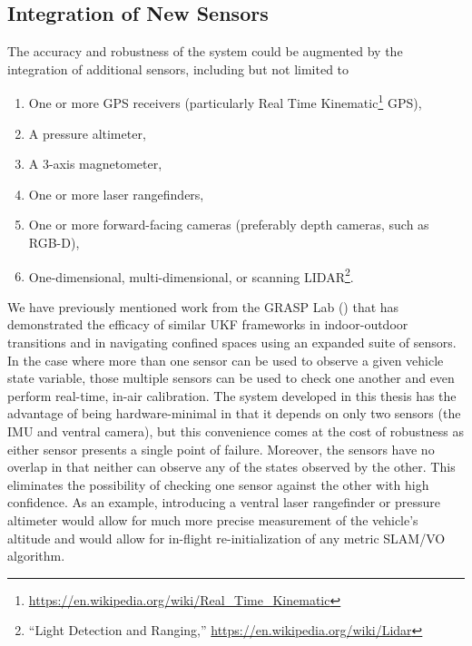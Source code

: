 \subsection{Integration of New Sensors}
The accuracy and robustness of the system could be augmented by the integration of additional sensors, including but not limited to
\begin{enumerate}
    \item One or more GPS receivers (particularly Real Time Kinematic\footnote{\url{https://en.wikipedia.org/wiki/Real_Time_Kinematic}} GPS),
    \item A pressure altimeter,
    \item A 3-axis magnetometer,
    \item One or more laser rangefinders,
    \item One or more forward-facing cameras (preferably depth cameras, such as RGB-D),
    \item One-dimensional, multi-dimensional, or scanning LIDAR\footnote{``Light Detection and Ranging,'' \url{https://en.wikipedia.org/wiki/Lidar}}.
\end{enumerate}
We have previously mentioned work from the GRASP Lab (\cite{Shen2011}) that has demonstrated the efficacy of similar UKF frameworks in indoor-outdoor transitions and in navigating confined spaces using an expanded suite of sensors. In the case where more than one sensor can be used to observe a given vehicle state variable, those multiple sensors can be used to check one another and even perform real-time, in-air calibration. The system developed in this thesis has the advantage of being hardware-minimal in that it depends on only two sensors (the IMU and ventral camera), but this convenience comes at the cost of robustness as either sensor presents a single point of failure. Moreover, the sensors have no overlap in that neither can observe any of the states observed by the other. This eliminates the possibility of checking one sensor against the other with high confidence. As an example, introducing a ventral laser rangefinder or pressure altimeter would allow for much more precise measurement of the vehicle's altitude and would allow for in-flight re-initialization of any metric SLAM/VO algorithm.

